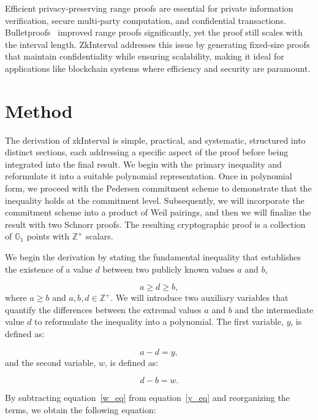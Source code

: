\documentclass[version=preprint]{iacrcc}
\begin{document}
Efficient privacy-preserving range proofs are essential for private information verification, secure multi-party computation, and confidential transactions. Bulletproofs~\cite{bbb18} improved range proofs significantly, yet the proof still scales with the interval length. ZkInterval addresses this issue by generating fixed-size proofs that maintain confidentiality while ensuring scalability, making it ideal for applications like blockchain systems where efficiency and security are paramount.

\section{Method}

The derivation of zkInterval is simple, practical, and systematic, structured into distinct sections, each addressing a specific aspect of the proof before being integrated into the final result. We begin with the primary inequality and reformulate it into a suitable polynomial representation. Once in polynomial form, we proceed with the Pedersen commitment scheme to demonstrate that the inequality holds at the commitment level. Subsequently, we will incorporate the commitment scheme into a product of Weil pairings, and then we will finalize the result with two Schnorr proofs. The resulting cryptographic proof is a collection of \(\mathbb{G}_{1}\) points with \( \mathbb{Z}^+ \) scalars.

We begin the derivation by stating the fundamental inequality that establishes the existence of a value $d$ between two publicly known values $a$ and $b$,

\begin{equation}
a \geq d \geq b,
\end{equation}
where \( a \geq b \) and \( a, b, d \in \mathbb{Z}^+ \). We will introduce two auxiliary variables that quantify the differences between the extremal values \(a\) and \(b\) and the intermediate value \(d\) to reformulate the inequality into a polynomial. The first variable, \( y \), is defined as:

\begin{equation}
\label{y_eq}
a - d = y,
\end{equation}
and the second variable, \( w \), is defined as:

\begin{equation}
\label{w_eq}
d - b = w.
\end{equation}

By subtracting equation~\ref{w_eq} from equation~\ref{y_eq} and reorganizing the terms, we obtain the following equation:
\end{document}

